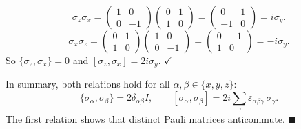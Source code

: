 \documentclass[12pt]{article}
\begin{document}
\[
\sigma_z\sigma_x = \begin{pmatrix} 1&0\\0&-1 \end{pmatrix}\begin{pmatrix} 0&1\\1&0 \end{pmatrix} = \begin{pmatrix} 0&1\\-1&0 \end{pmatrix} = i\sigma_y.
\]
\[
\sigma_x\sigma_z = \begin{pmatrix} 0&1\\1&0 \end{pmatrix}\begin{pmatrix} 1&0\\0&-1 \end{pmatrix} = \begin{pmatrix} 0&-1\\1&0 \end{pmatrix} = -i\sigma_y.
\]
So $\{\sigma_z,\sigma_x\} = 0$ and $[\sigma_z,\sigma_x] = 2i\sigma_y$. $\checkmark$

\medskip
In summary, both relations hold for all $\alpha,\beta \in \{x,y,z\}$:
\[
\{\sigma_\alpha, \sigma_\beta\} = 2\delta_{\alpha\beta}I, \qquad [\sigma_\alpha, \sigma_\beta] = 2i\sum_\gamma \varepsilon_{\alpha\beta\gamma}\,\sigma_\gamma.
\]
The first relation shows that distinct Pauli matrices anticommute. \hfill $\blacksquare$
\end{document}
